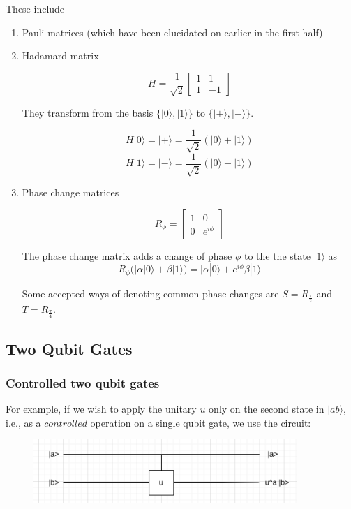 \documentclass{article}
\begin{document}
These include 

\begin{enumerate}
    \item Pauli matrices (which have been elucidated on earlier in the first half)
    \item Hadamard matrix

    $$H = \frac{1}{\sqrt{2}} \begin{bmatrix}
            1 & 1\\
            1 & -1
    \end{bmatrix}$$

    They transform from the basis $\{|0\rangle, |1\rangle\}$ to $\{|+\rangle, |-\rangle\}$.

    $$H|0\rangle = |+\rangle = \frac{1}{\sqrt{2}}(|0\rangle + |1\rangle)$$    
    $$H|1\rangle = |-\rangle = \frac{1}{\sqrt{2}}(|0\rangle - |1\rangle)$$    
    
    \item Phase change matrices

    $$R_{\phi} = \begin{bmatrix}
            1 & 0\\
            0 & e^{i\phi}    
    \end{bmatrix}$$

    The phase change matrix adds a change of phase $\phi$ to the the state $|1\rangle$ as $$R_{\phi}(|\alpha |0\rangle + \beta |1\rangle) = |\alpha |0\rangle + e^{i\phi}\beta |1\rangle$$

    Some accepted ways of denoting common phase changes are $S=R_{\frac{\pi}{2}}$ and $T=R_{\frac{\pi}{4}}$.
    
\end{enumerate}

\subsection{Two Qubit Gates}

\subsubsection{Controlled two qubit gates}

For example, if we wish to apply the unitary $u$ only on the second state in $|ab\rangle$, i.e., as a $controlled$ operation on a single qubit gate, we use the circuit:

\begin{figure}[htp]
    \centering
    \includegraphics[width=10cm]{twoqubit.png}
\end{figure}
\end{document}
